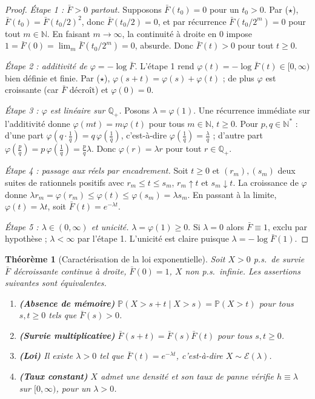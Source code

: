 \documentclass[11pt,a4paper]{article}
\theoremstyle{plain}
\newtheorem{theoreme}{Théorème}[section]
\theoremstyle{definition}
\theoremstyle{remark}
\newcommand{\N}{\mathbb{N}}
\newcommand{\Q}{\mathbb{Q}}
\newcommand{\Prob}{\mathbb{P}}
\newcommand{\Expo}{\mathcal{E}}
\newcommand{\barF}{\bar{F}}
\begin{document}
\begin{proof}
\emph{Étape 1 : $\barF>0$ partout.} Supposons $\barF(t_0)=0$ pour un $t_0>0$.
Par ($\star$), $\barF(t_0)=\barF(t_0/2)^2$, donc $\barF(t_0/2)=0$, et par
récurrence $\barF(t_0/2^m)=0$ pour tout $m\in\N$. En faisant $m\to\infty$, la
continuité à droite en $0$ impose $1=\barF(0)=\lim_{m}\barF(t_0/2^m)=0$,
absurde. Donc $\barF(t)>0$ pour tout $t\ge0$.

\emph{Étape 2 : additivité de $\varphi=-\log\barF$.} L'étape 1 rend
$\varphi(t)=-\log\barF(t)\in[0,\infty)$ bien définie et finie. Par ($\star$),
$\varphi(s+t)=\varphi(s)+\varphi(t)$ ; de plus $\varphi$ est croissante (car
$\barF$ décroît) et $\varphi(0)=0$.

\emph{Étape 3 : $\varphi$ est linéaire sur $\Q_+$.} Posons $\lambda=\varphi(1)$.
Une récurrence immédiate sur l'additivité donne $\varphi(m t)=m\varphi(t)$ pour
tous $m\in\N$, $t\ge0$. Pour $p,q\in\N^*$ : d'une part
$\varphi(q\cdot\tfrac1q)=q\,\varphi(\tfrac1q)$, c'est-à-dire
$\varphi(\tfrac1q)=\tfrac\lambda q$ ; d'autre part
$\varphi(\tfrac pq)=p\,\varphi(\tfrac1q)=\tfrac pq\lambda$. Donc
$\varphi(r)=\lambda r$ pour tout $r\in\Q_+$.

\emph{Étape 4 : passage aux réels par encadrement.} Soit $t\ge0$ et $(r_m),(s_m)$
deux suites de rationnels positifs avec $r_m\le t\le s_m$, $r_m\uparrow t$ et
$s_m\downarrow t$. La croissance de $\varphi$ donne
$\lambda r_m=\varphi(r_m)\le\varphi(t)\le\varphi(s_m)=\lambda s_m$. En passant à
la limite, $\varphi(t)=\lambda t$, soit $\barF(t)=e^{-\lambda t}$.

\emph{Étape 5 : $\lambda\in(0,\infty)$ et unicité.} $\lambda=\varphi(1)\ge0$. Si
$\lambda=0$ alors $\barF\equiv1$, exclu par hypothèse ; $\lambda<\infty$ par
l'étape 1. L'unicité est claire puisque $\lambda=-\log\barF(1)$.
\end{proof}

\begin{theoreme}[Caractérisation de la loi exponentielle]\label{th:carac}
Soit $X>0$ p.s.\ de survie $\barF$ décroissante continue à droite,
$\barF(0)=1$, $X$ non p.s.\ infinie. Les assertions suivantes sont équivalentes.
\begin{enumerate}[label=(\roman*),leftmargin=2.2em,itemsep=0.15em]
  \item \textbf{(Absence de mémoire)} $\Prob(X>s+t\mid X>s)=\Prob(X>t)$ pour tous
  $s,t\ge0$ tels que $\barF(s)>0$.
  \item \textbf{(Survie multiplicative)} $\barF(s+t)=\barF(s)\barF(t)$ pour tous $s,t\ge0$.
  \item \textbf{(Loi)} Il existe $\lambda>0$ tel que $\barF(t)=e^{-\lambda t}$,
  c'est-à-dire $X\sim\Expo(\lambda)$.
  \item \textbf{(Taux constant)} $X$ admet une densité et son taux de panne
  vérifie $h\equiv\lambda$ sur $[0,\infty)$, pour un $\lambda>0$.
\end{enumerate}
\end{theoreme}
\end{document}

